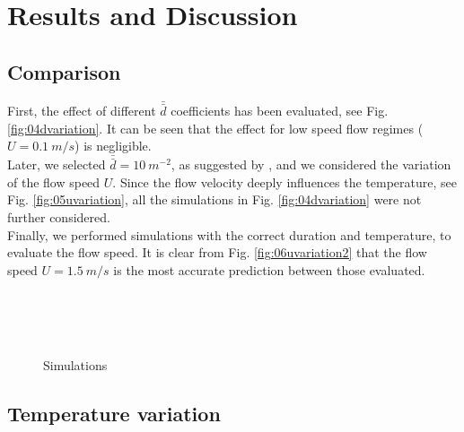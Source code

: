 
\section{Results and Discussion}
\label{section:resultsdiscussion}



\subsection{Comparison}
\label{subsection:comparison}

First, the effect of different $\bar{\bar{d}}$ coefficients has been evaluated, see Fig.
\ref{fig:04dvariation}.
It can be seen that the effect for low speed flow regimes ($U = 0.1 ~m/s$) is
negligible.\\
Later, we selected $\bar{\bar{d}} = 10 ~m^{-2}$, as suggested by
\textcite{Permeability}, and we considered the variation of the flow speed $U$.
Since the flow velocity deeply influences the temperature, see Fig.
\ref{fig:05uvariation}, all the simulations in Fig. \ref{fig:04dvariation} were
not further considered.\\
Finally, we performed simulations with the correct duration and temperature, to
evaluate the flow speed.
It is clear from Fig. \ref{fig:06uvariation2} that the flow speed $U = 1.5 ~m/s$
is the most accurate prediction between those evaluated.

\begin{figure}[!h]
\centering
{} \\ 
 \\  
 \\  
\caption[Simulations]{Simulations}
\label{fig:simulations}
\end{figure}

\subsection{Temperature variation}
\label{subsection:temperaturevariation}

